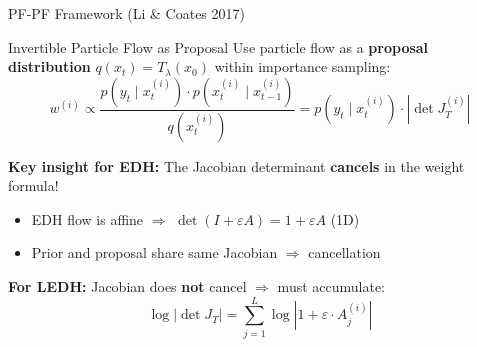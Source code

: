 \documentclass[aspectratio=169,10pt]{beamer}
\newcommand{\highlight}[1]{\textcolor{jpmlightblue}{\textbf{#1}}}
\begin{document}
\begin{frame}{PF-PF Framework (Li \& Coates 2017)}
\begin{block}{Invertible Particle Flow as Proposal}
Use particle flow as a \highlight{proposal distribution} $q(x_t) = T_\lambda(x_0)$ within importance sampling:
\[
  w^{(i)} \propto \frac{p(y_t \mid x_t^{(i)}) \cdot p(x_t^{(i)} \mid x_{t-1}^{(i)})}{q(x_t^{(i)})} = p(y_t \mid x_t^{(i)}) \cdot |\det J_T^{(i)}|
\]
\end{block}

\vspace{0.3em}
\textbf{Key insight for EDH:} The Jacobian determinant \highlight{cancels} in the weight formula!
\begin{itemize}
  \item EDH flow is affine $\Rightarrow$ $\det(I + \varepsilon A) = 1 + \varepsilon A$ (1D)
  \item Prior and proposal share same Jacobian $\Rightarrow$ cancellation
\end{itemize}

\vspace{0.3em}
\textbf{For LEDH:} Jacobian does \textbf{not} cancel $\Rightarrow$ must accumulate:
\[
  \log|\det J_T| = \sum_{j=1}^{L} \log|1 + \varepsilon \cdot A_j^{(i)}|
\]
\end{frame}
\end{document}
